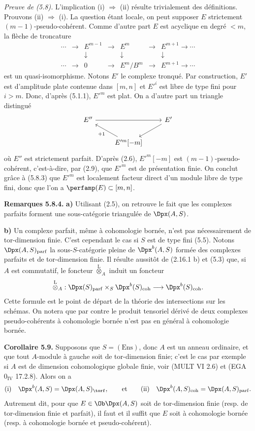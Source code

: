 \documentclass[11pt]{article}
\begin{document}
\emph{Preuve de (5.8).} L'implication (i) \(\Rightarrow\) (ii) résulte trivialement des définitions. Prouvons (ii) \(\Rightarrow\) (i). La question étant locale, on peut supposer \(E\) strictement \((m-1)\)-pseudo-cohérent. Comme d'autre part \(E\) est acyclique en degré \(<m\), la flèche de troncature
\[
\begin{array}{ccccccc}
\cdots&\to&E^{m-1}&\to&E^m&\to&E^{m+1}\to\cdots\\
&&\downarrow&&\downarrow&&\downarrow\\
\cdots&\to&0&\to&E^m/B^m&\to&E^{m+1}\to\cdots
\end{array}
\]
est un quasi-isomorphisme. Notons \(E'\) le complexe tronqué. Par construction, \(E'\) est d'amplitude plate contenue dans \([m,n]\) et \(E'^i\) est libre de type fini pour \(i>m\). Donc, d'après (5.1.1), \(E'^m\) est plat. On a d'autre part un triangle distingué
\[
\begin{tikzcd}
E'' \arrow[rr] && E' \arrow[dl]\\
& E'^m[-m] \arrow[ul,"+1"] &
\end{tikzcd}
\]
où \(E''\) est strictement parfait. D'après (2.6), \(E'^m[-m]\) est \((m-1)\)-pseudo-cohérent, c'est-à-dire, par (2.9), que \(E'^m\) est de présentation finie. On conclut grâce à (5.8.3) que \(E'^m\) est localement facteur direct d'un module libre de type fini, donc que l'on a \(\perfamp(E)\subset[m,n]\).

\textbf{Remarques 5.8.4.} \textbf{a)} Utilisant (2.5), on retrouve le fait que les complexes parfaits forment une sous-catégorie triangulée de \(\Dpx(A,S)\).

\textbf{b)} Un complexe parfait, même à cohomologie bornée, n'est pas nécessairement de tor-dimension finie. C'est cependant le cas si \(S\) est de type fini (5.5). Notons \(\Dpx(A,S)_{\mathrm{parf}}\) la sous-\(S\)-catégorie pleine de \(\Dpx^b(A,S)\) formée des complexes parfaits et de tor-dimension finie. Il résulte aussitôt de (2.16.1 b) et (5.3) que, si \(A\) est commutatif, le foncteur \(\overset{\mathrm L}{\otimes}_A\) induit un foncteur
\[
  \overset{\mathrm L}{\otimes}_A:
  \Dpx(S)_{\mathrm{parf}}\times_S \Dpx^b(S)_{\mathrm{coh}}
  \longrightarrow \Dpx^b(S)_{\mathrm{coh}}.
\]
Cette formule est le point de départ de la théorie des intersections sur les schémas. On notera que par contre le produit tensoriel dérivé de deux complexes pseudo-cohérents à cohomologie bornée n'est pas en général à cohomologie bornée.

\textbf{Corollaire 5.9.} Supposons que \(S=(\mathrm{Ens})\), donc \(A\) est un anneau ordinaire, et que tout \(A\)-module à gauche soit de tor-dimension finie; c'est le cas par exemple si \(A\) est de dimension cohomologique globale finie, voir (MULT VI 2.6) et (EGA \(0_{\mathrm{IV}}\) 17.2.8). Alors on a
\[
\text{(i)}\quad \Dpx^b(A,S)=\Dpx(A,S)_{\torf},
\qquad
\text{et}
\qquad
\text{(ii)}\quad \Dpx^b(A,S)_{\mathrm{coh}}=\Dpx(A,S)_{\mathrm{parf}}.
\]
Autrement dit, pour que \(E\in\Ob\Dpx(A,S)\) soit de tor-dimension finie (resp. de tor-dimension finie et parfait), il faut et il suffit que \(E\) soit à cohomologie bornée (resp. à cohomologie bornée et pseudo-cohérent).
\end{document}
